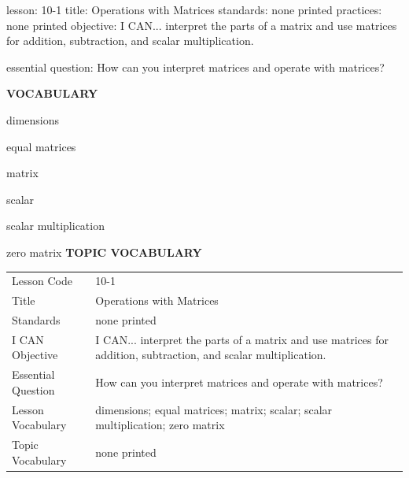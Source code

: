 \documentclass{article}
\newenvironment{lesson-meta}{}{}        %
\newcommand{\te}[1]{}                   %
\begin{document}
\begin{lesson-meta}
lesson: 10-1
title: Operations with Matrices
standards: none printed
practices: none printed
objective: I CAN... interpret the parts of a matrix and use matrices for addition, subtraction, and scalar multiplication.

essential question: How can you interpret matrices and operate with matrices?

\textbf{VOCABULARY}
\item dimensions
\item equal matrices
\item matrix
\item scalar
\item scalar multiplication
\item zero matrix
\textbf{TOPIC VOCABULARY}
\te{No separate topic vocabulary list is printed on these lesson pages.}
\begin{tabular}{ll}
Lesson Code & 10-1 \\
Title & Operations with Matrices \\
Standards & none printed \\
I CAN Objective & I CAN... interpret the parts of a matrix and use matrices for addition, subtraction, and scalar multiplication. \\
Essential Question & How can you interpret matrices and operate with matrices? \\
Lesson Vocabulary & dimensions; equal matrices; matrix; scalar; scalar multiplication; zero matrix \\
Topic Vocabulary & none printed \\
\end{tabular}
\end{lesson-meta}
\end{document}
